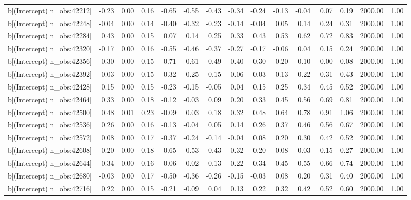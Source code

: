 \begin{table}[ht]
\begin{tabular}{rrrrrrrrrrrrrrr}
  b[(Intercept) n\_obs:42212] & -0.23 & 0.00 & 0.16 & -0.65 & -0.55 & -0.43 & -0.34 & -0.24 & -0.13 & -0.04 & 0.07 & 0.19 & 2000.00 & 1.00 \\ 
  b[(Intercept) n\_obs:42248] & -0.04 & 0.00 & 0.14 & -0.40 & -0.32 & -0.23 & -0.14 & -0.04 & 0.05 & 0.14 & 0.24 & 0.31 & 2000.00 & 1.00 \\ 
  b[(Intercept) n\_obs:42284] & 0.43 & 0.00 & 0.15 & 0.07 & 0.14 & 0.25 & 0.33 & 0.43 & 0.53 & 0.62 & 0.72 & 0.83 & 2000.00 & 1.00 \\ 
  b[(Intercept) n\_obs:42320] & -0.17 & 0.00 & 0.16 & -0.55 & -0.46 & -0.37 & -0.27 & -0.17 & -0.06 & 0.04 & 0.15 & 0.24 & 2000.00 & 1.00 \\ 
  b[(Intercept) n\_obs:42356] & -0.30 & 0.00 & 0.15 & -0.71 & -0.61 & -0.49 & -0.40 & -0.30 & -0.20 & -0.10 & -0.00 & 0.08 & 2000.00 & 1.00 \\ 
  b[(Intercept) n\_obs:42392] & 0.03 & 0.00 & 0.15 & -0.32 & -0.25 & -0.15 & -0.06 & 0.03 & 0.13 & 0.22 & 0.31 & 0.43 & 2000.00 & 1.00 \\ 
  b[(Intercept) n\_obs:42428] & 0.15 & 0.00 & 0.15 & -0.23 & -0.15 & -0.05 & 0.04 & 0.15 & 0.25 & 0.34 & 0.45 & 0.52 & 2000.00 & 1.00 \\ 
  b[(Intercept) n\_obs:42464] & 0.33 & 0.00 & 0.18 & -0.12 & -0.03 & 0.09 & 0.20 & 0.33 & 0.45 & 0.56 & 0.69 & 0.81 & 2000.00 & 1.00 \\ 
  b[(Intercept) n\_obs:42500] & 0.48 & 0.01 & 0.23 & -0.09 & 0.03 & 0.18 & 0.32 & 0.48 & 0.64 & 0.78 & 0.91 & 1.06 & 2000.00 & 1.00 \\ 
  b[(Intercept) n\_obs:42536] & 0.26 & 0.00 & 0.16 & -0.13 & -0.04 & 0.05 & 0.14 & 0.26 & 0.37 & 0.46 & 0.56 & 0.67 & 2000.00 & 1.00 \\ 
  b[(Intercept) n\_obs:42572] & 0.08 & 0.00 & 0.17 & -0.37 & -0.24 & -0.14 & -0.04 & 0.08 & 0.20 & 0.30 & 0.42 & 0.52 & 2000.00 & 1.00 \\ 
  b[(Intercept) n\_obs:42608] & -0.20 & 0.00 & 0.18 & -0.65 & -0.53 & -0.43 & -0.32 & -0.20 & -0.08 & 0.03 & 0.15 & 0.27 & 2000.00 & 1.00 \\ 
  b[(Intercept) n\_obs:42644] & 0.34 & 0.00 & 0.16 & -0.06 & 0.02 & 0.13 & 0.22 & 0.34 & 0.45 & 0.55 & 0.66 & 0.74 & 2000.00 & 1.00 \\ 
  b[(Intercept) n\_obs:42680] & -0.03 & 0.00 & 0.17 & -0.50 & -0.36 & -0.26 & -0.15 & -0.03 & 0.08 & 0.20 & 0.31 & 0.40 & 2000.00 & 1.00 \\ 
  b[(Intercept) n\_obs:42716] & 0.22 & 0.00 & 0.15 & -0.21 & -0.09 & 0.04 & 0.13 & 0.22 & 0.32 & 0.42 & 0.52 & 0.60 & 2000.00 & 1.00 \\ 

\end{tabular}
\end{table}
